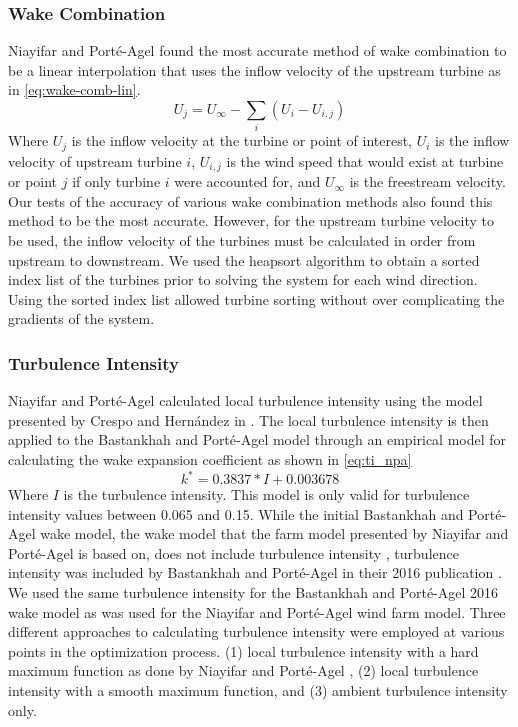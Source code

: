 \documentclass[conf]{new-aiaa}
\begin{document}
\subsubsection{Wake Combination}
Niayifar and Port\'{e}-Agel found the most accurate method of wake combination to be a linear interpolation that uses the inflow velocity of the upstream turbine as in \cref{eq:wake-comb-lin}. 
%
\begin{equation}\label{eq:wake-comb-lin}
	U_j = U_\infty - \sum_i (U_i - U_{i,j})
\end{equation}
%
Where $U_j$ is the inflow velocity at the turbine or point of interest, $U_i$ is the inflow velocity of upstream turbine $i$, $U_{i,j}$ is the wind speed that would exist at turbine or point $j$ if only turbine $i$ were accounted for, and $U_{\infty}$ is the freestream velocity. Our tests of the accuracy of various wake combination methods also found this method to be the most accurate. However, for the upstream turbine velocity to be used, the inflow velocity of the turbines must be calculated in order from upstream to downstream. We used the heapsort algorithm to obtain a sorted index list of the turbines prior to solving the system for each wind direction. Using the sorted index list allowed turbine sorting without over complicating the gradients of the system.

\subsubsection{Turbulence Intensity}
Niayifar and Port\'{e}-Agel calculated local turbulence intensity using the model presented by Crespo and Hern\'{a}ndez in \cite{crespo1996}. The local turbulence intensity is then applied to the Bastankhah and Port\'{e}-Agel model through an empirical model for calculating the wake expansion coefficient as shown in \cref{eq:ti_npa} \cite{niayifar2016}
 \begin{equation} \label{eq:ti_npa}
 	k^* = 0.3837*I + 0.003678
 \end{equation}
%
Where $I$ is the turbulence intensity. This model is only valid for turbulence intensity values between 0.065 and 0.15. While the initial Bastankhah and Port\'{e}-Agel wake model, the wake model that the farm model presented by Niayifar and Port\'{e}-Agel is based on, does not include turbulence intensity \cite{bastankhah2014}, turbulence intensity was included by Bastankhah and Port\'{e}-Agel in their 2016 publication \cite{bastankhah2016}. We used the same turbulence intensity for the Bastankhah and Port\'{e}-Agel 2016 wake model as was used for the Niayifar and Port\'{e}-Agel wind farm model. Three different approaches to calculating turbulence intensity were employed at various points in the optimization process. (1) local turbulence intensity with a hard maximum function as done by Niayifar and Port\'{e}-Agel \cite{niayifar2016}, (2) local turbulence intensity with a smooth maximum function, and (3) ambient turbulence intensity only.
\end{document}
